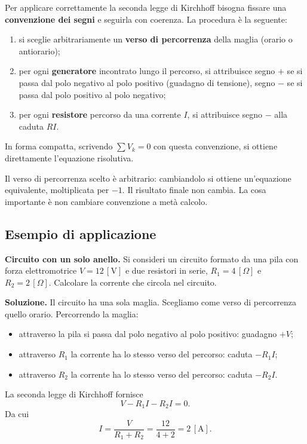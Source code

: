 Per applicare correttamente la seconda legge di Kirchhoff bisogna fissare una \textbf{convenzione dei segni} e seguirla con coerenza. La procedura è la seguente:

\begin{enumerate}[leftmargin=1cm]
  \item si sceglie arbitrariamente un \textbf{verso di percorrenza} della maglia (orario o antiorario);
  \item per ogni \textbf{generatore} incontrato lungo il percorso, si attribuisce segno \(+\) se si passa dal polo negativo al polo positivo (guadagno di tensione), segno \(-\) se si passa dal polo positivo al polo negativo;
  \item per ogni \textbf{resistore} percorso da una corrente \(I\), si attribuisce segno \(-\) alla caduta \(RI\).
\end{enumerate}

In forma compatta, scrivendo \(\sum V_k = 0\) con questa convenzione, si ottiene direttamente l'equazione risolutiva.

\begin{attenzione}
Il verso di percorrenza scelto è arbitrario: cambiandolo si ottiene un'equazione equivalente, moltiplicata per \(-1\). Il risultato finale non cambia. La cosa importante è non cambiare convenzione a metà calcolo.
\end{attenzione}

\subsection{Esempio di applicazione}

\begin{esempio}
\textbf{Circuito con un solo anello.} Si consideri un circuito formato da una pila con forza elettromotrice \(V = 12\,[\text{V}]\) e due resistori in serie, \(R_1 = 4\,[\Omega]\) e \(R_2 = 2\,[\Omega]\). Calcolare la corrente che circola nel circuito.

\smallskip
\textbf{Soluzione.} Il circuito ha una sola maglia. Scegliamo come verso di percorrenza quello orario. Percorrendo la maglia:

\begin{itemize}[leftmargin=1cm]
  \item attraverso la pila si passa dal polo negativo al polo positivo: guadagno \(+V\);
  \item attraverso \(R_1\) la corrente ha lo stesso verso del percorso: caduta \(-R_1 I\);
  \item attraverso \(R_2\) la corrente ha lo stesso verso del percorso: caduta \(-R_2 I\).
\end{itemize}

La seconda legge di Kirchhoff fornisce
\[
V - R_1 I - R_2 I = 0.
\]
Da cui
\[
I = \frac{V}{R_1 + R_2} = \frac{12}{4 + 2} = 2\,[\text{A}].
\]
\end{esempio}

